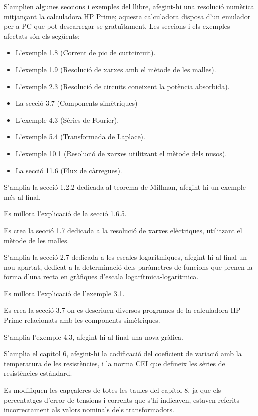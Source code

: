 S'amplien algunes seccions i exemples del llibre, afegint-hi una  resolució numèrica mitjançant la calculadora \textsf{HP Prime};  aquesta calculadora disposa d'un emulador per a PC que pot descarregar-se gratuïtament. Les seccions i els exemples afectats són els següents:
\begin{itemize}
  \item L'exemple 1.8  (Corrent de pic de curtcircuit).
  \item L'exemple 1.9 (Resolució de xarxes amb el mètode de les malles).
  \item L'exemple 2.3 (Resolució de circuits coneixent la potència absorbida).
  \item La secció 3.7 (Components simètriques)
  \item L'exemple 4.3 (Sèries de Fourier).
  \item L'exemple 5.4 (Transformada de Laplace).
  \item L'exemple 10.1 (Resolució de xarxes utilitzant el mètode dels nusos).
  \item La secció 11.6 (Flux de càrregues).
\end{itemize}

S'amplia la secció 1.2.2 dedicada al teorema de Millman, afegint-hi un exemple més al final.

Es millora l'explicació de la secció 1.6.5.

Es crea la secció 1.7 dedicada a la resolució de xarxes elèctriques, utilitzant el mètode de les malles.

S'amplia la secció 2.7 dedicada a les escales logarítmiques, afegint-hi al final un nou apartat, dedicat a la determinació dels paràmetres de funcions que prenen la forma d'una recta en gràfiques d'escala logarítmica-logarítmica.

Es millora l'explicació de l'exemple 3.1.

Es crea la secció 3.7 on es descriuen diversos programes de la calculadora
\textsf{HP Prime} relacionats amb les components simètriques.

S'amplia l'exemple 4.3, afegint-hi al final  una nova gràfica.

S'amplia el capítol 6, afegint-hi la codificació del coeficient de variació amb la temperatura de les resistències, i la norma CEI que defineix les sèries de resistències estàndard.

Es modifiquen les capçaleres de totes les taules del capítol 8, ja que els percentatges d'error de tensions i corrents que s'hi indicaven, estaven referits incorrectament als valors nominals dels transformadors.

